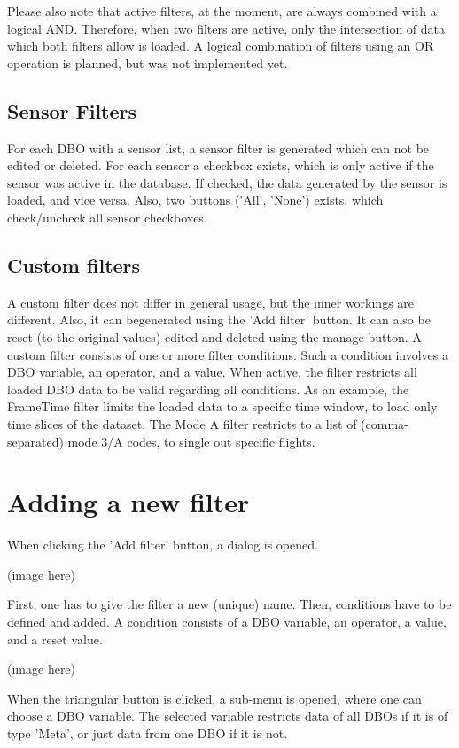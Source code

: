 \documentclass[10pt,letterpaper,extrafontsizes]{memoir}
\begin{document}
Please also note that active filters, at the moment, are always combined with a logical AND. Therefore,
when  two  filters  are  active,  only  the  intersection  of  data  which  both  filters  allow  is  loaded.   A  logical combination of filters using an OR operation is planned, but was not implemented yet.

\subsection{Sensor Filters}
For each DBO with a sensor list, a sensor filter is generated which can not be edited or deleted.  For each
sensor a checkbox exists, which is only active if the sensor was active in the database.  If checked, the
data generated by the sensor is loaded, and vice versa.  Also, two buttons ('All', 'None') exists, which
check/uncheck all sensor checkboxes.

\subsection{Custom filters}
A  custom  filter  does  not  differ  in  general  usage,  but  the  inner  workings  are  different.   Also,  it  can  begenerated using the 'Add filter' button. It can also be reset (to the original values) edited and deleted using
the manage button.
A custom filter consists of one or more filter conditions.  Such a condition involves a DBO variable,
an operator, and a value.  When active, the filter restricts all loaded DBO data to be valid regarding all
conditions.
As an example, the FrameTime filter limits the loaded data to a specific time window, to load only time
slices of the dataset.  The Mode A filter restricts to a list of (comma-separated) mode 3/A codes, to single
out specific flights.

\section{Adding a new filter}
When clicking the 'Add filter' button, a dialog is opened.

(image here)

First, one has to give the filter a new (unique) name. Then, conditions have to be defined and added. A
condition consists of a DBO variable, an operator, a value, and a reset value.

(image here)

When the triangular button is clicked, a sub-menu is opened, where one can choose a DBO variable. The
selected variable restricts data of all DBOs if it is of type 'Meta', or just data from one DBO if it is not.
\end{document}
